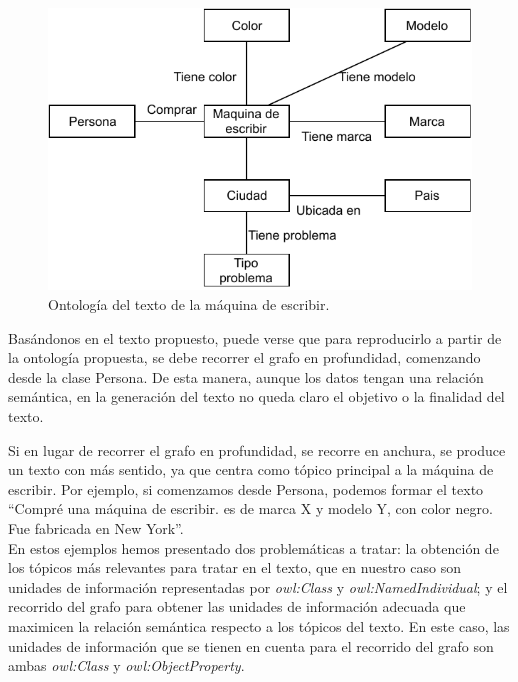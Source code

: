 \begin{figure}
    \centering
    \includegraphics[scale=0.65]{img/presentacion_problema/onto_maq_escr.pdf}
    \caption{Ontología del texto de la máquina de escribir.}
    \label{fig:maquina_escr}
\end{figure}

Basándonos en el texto propuesto, puede verse que para reproducirlo a partir de la ontología propuesta, se debe recorrer el grafo en profundidad, comenzando desde la clase Persona. De esta manera, aunque los datos tengan una relación semántica, en la generación del texto no queda claro el objetivo o la finalidad del texto. 

Si en lugar de recorrer el grafo en profundidad, se recorre en anchura, se produce un texto con más sentido, ya que centra como tópico principal a la máquina de escribir. Por ejemplo, si comenzamos desde Persona, podemos formar el texto ``Compré una máquina de escribir. es de marca X y modelo Y, con color negro. Fue fabricada en New York''.
\\

En estos ejemplos hemos presentado dos problemáticas a tratar: la obtención de los tópicos más relevantes para tratar en el texto, que en nuestro caso son unidades de información representadas por \emph{owl:Class} y \emph{owl:NamedIndividual}; y el recorrido del grafo para obtener las unidades de información adecuada que maximicen la relación semántica respecto a los tópicos del texto. En este caso, las unidades de información que se tienen en cuenta para el recorrido del grafo son ambas \emph{owl:Class} y \emph{owl:ObjectProperty}.
 
